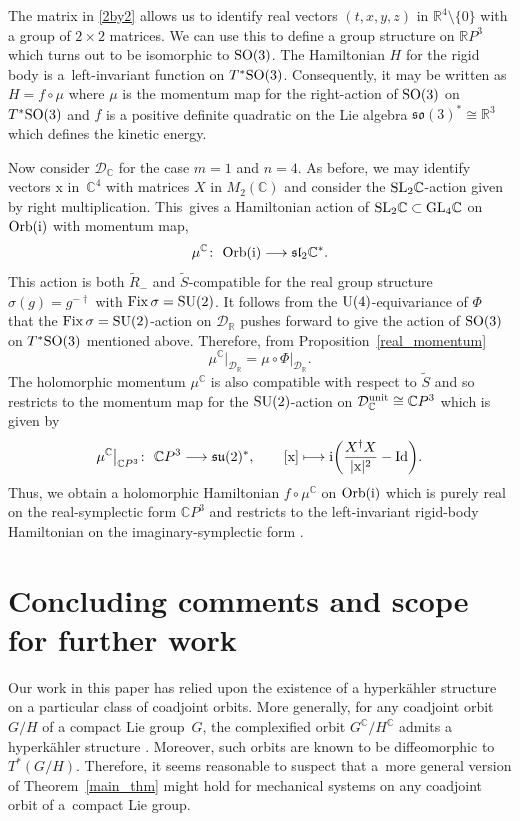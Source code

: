 \documentclass[pdftex]{sigma}
\numberwithin{equation}{section}
\DeclareMathOperator{\fix}{Fix}
\DeclareMathOperator{\Imag}{Im}
\newcommand{\R}{\mathbb{R}}
\newcommand{\C}{\mathbb{C}}
\newcommand{\CP}{\mathbb{C}P}
\newcommand{\D}{\mathcal{D}}
\newcommand{\RP}{\mathbb{R}P}
\newcommand{\Id}{{\rm Id}}
\begin{document}
\begin{Example}The matrix in \eqref{2by2} allows us to identify real vectors $(t,x,y,z)$ in $\R^4\setminus\{0\}$ with a group of $2\times 2$ matrices. We can use this to define a group structure on $\RP^3$ which turns out to be isomorphic to ${\rm SO}(3)$. The Hamiltonian $H$ for the rigid body is a~left-invariant function on $T^*{\rm SO}(3)$. Consequently, it may be written as $H=f\circ\mu$ where $\mu$ is the momentum map for the right-action of ${\rm SO}(3)$ on $T^*{\rm SO}(3)$ and $f$ is a positive definite quadratic on the Lie algebra $\mathfrak{so}(3)^*\cong\R^3$ which defines the kinetic energy.
		
Now consider $\D_\C$ for the case $m=1$ and $n=4$. As before, we may identify vectors $\text{x}$ in~$\C^4$ with matrices $X$ in $M_2(\C)$ and consider the ${\rm SL}_2\C$-action given by right multiplication. This~gives a Hamiltonian action of ${\rm SL}_2\C\subset {\rm GL}_4\C$ on ${\rm Orb}({\rm i})$ with momentum map,
		\[
		\mu^\C\colon \ {\rm Orb}({\rm i})\longrightarrow\mathfrak{sl}_2\C^*.
		\]
		This action is both $\widetilde{R}_-$ and $\widetilde{S}$-compatible for the real group structure $\sigma(g)=g^{-\dagger}$ with $\fix\sigma={\rm SU}(2)$. It follows from the ${\rm U}(4)$-equivariance of $\Phi$ that the $\fix\sigma={\rm SU}(2)$-action on $\D_\R$ pushes forward to give the action of ${\rm SO}(3)$ on $T^*{\rm SO}(3)$ mentioned above. Therefore, from Proposition~\ref{real_momentum}
		\[
		\mu^\C\big|_{\D_\R}=\mu\circ\Phi\big|_{\D_\R}.
		\]
		The holomorphic momentum $\mu^\C$ is also compatible with respect to $\widetilde{S}$ and so restricts to the momentum map for the ${\rm SU}(2)$-action on $\D_{\C}^{\rm unit}\cong\CP^3$ which is given by
		\begin{equation*}
			\mu^\C\big|_{\CP^3}\colon \ \CP^3\longrightarrow\mathfrak{su}(2)^*,\qquad [\text{x}]\longmapsto {\rm i}\biggl(\frac{X^\dagger X}{|\text{x}|^2}-\Id\biggr).
		\end{equation*}
		Thus, we obtain a holomorphic Hamiltonian $f\circ\mu^\C$ on ${\rm Orb}({\rm i})$ which is purely real on the real-symplectic form $\CP^3$ and restricts to the left-invariant rigid-body Hamiltonian on the imaginary-symplectic form \smash{$(\D_\R,\Imag\Omega_{\rm KKS})\overset{\Phi}{\rightarrow}(T^*\RP^3,\omega_\text{can})$}.
	\end{Example}

	\section{Concluding comments and scope for further work}
	Our work in this paper has relied upon the existence of a hyperk\"{a}hler structure on a particular class of coadjoint orbits. More generally, for any coadjoint orbit $G/H$ of a compact Lie group~$G$, the complexified orbit $G^\C/H^\C$ admits a hyperk\"{a}hler structure \cite{french2,kovalev}. Moreover, such orbits are known to be diffeomorphic to $T^*(G/H)$. Therefore, it seems reasonable to suspect that a~more general version of Theorem~\ref{main_thm} might hold for mechanical systems on any coadjoint orbit of a~compact Lie group.
	
\end{document}
